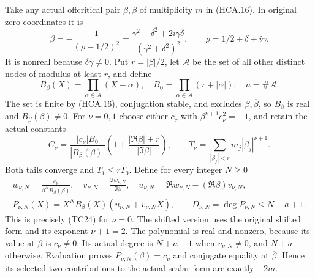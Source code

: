Take any actual offcritical pair $\beta,\overline\beta$ of
multiplicity $m$ in (HCA.16). In original zero coordinates it is
\[
 \beta=-\frac1{(\rho-1/2)^2}
 =\frac{\gamma^2-\delta^2+2i\gamma\delta}
                       {(\gamma^2+\delta^2)^2},
 \qquad\rho=1/2+\delta+i\gamma.
 \tag{HCA.21}
\]
It is nonreal because $\delta\gamma\ne0$. Put $r=|\beta|/2$,
let $\mathcal A$ be the set of all other distinct nodes of modulus
at least $r$, and define
\[
 B_\beta(X)=\prod_{\alpha\in\mathcal A}(X-\alpha),\quad
 B_0=\prod_{\alpha\in\mathcal A}(r+|\alpha|),\quad a=\#\mathcal A.
 \tag{HCA.22}
\]
The set is finite by (HCA.16), conjugation stable, and excludes
$\beta,\overline\beta$, so $B_\beta$ is real and
$B_\beta(\beta)\ne0$. For $\nu=0,1$ choose either $c_\nu$ with
$\beta^{\nu+1}c_\nu^2=-1$, and retain the actual constants
\[
 C_\nu=\frac{|c_\nu|B_0}{|B_\beta(\beta)|}
        \left(1+\frac{|\Re\beta|+r}{|\Im\beta|}\right),\qquad
 T_\nu=\sum_{|\beta_j|<r}m_j|\beta_j|^{\nu+1}.
 \tag{HCA.23}
\]
Both tails converge and $T_1\leq rT_0$. Define for every integer
$N\geq0$
\[
 \begin{gathered}
 w_{\nu,N}=\frac{c_\nu}{\beta^NB_\beta(\beta)},\quad
 v_{\nu,N}=\frac{\Im w_{\nu,N}}{\Im\beta},\quad
 u_{\nu,N}=\Re w_{\nu,N}-(\Re\beta)v_{\nu,N},\\
 P_{\nu,N}(X)=X^NB_\beta(X)(u_{\nu,N}+v_{\nu,N}X),
 \qquad D_{\nu,N}=\deg P_{\nu,N}\leq N+a+1.
 \end{gathered}
 \tag{HCA.24}
\]
This is precisely (TC24) for $\nu=0$. The shifted version uses
the original shifted form and its exponent $\nu+1=2$.
The polynomial is real and nonzero, because its value at $\beta$
is $c_\nu\ne0$. Its actual degree is $N+a+1$ when
$v_{\nu,N}\ne0$, and $N+a$ otherwise. Evaluation proves
$P_{\nu,N}(\beta)=c_\nu$ and conjugate equality at
$\overline\beta$. Hence its selected two contributions to
the actual scalar form are exactly $-2m$.

